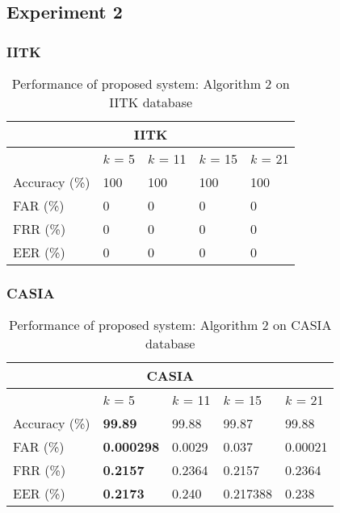 \documentclass{beamer}
\begin{document}
\subsection{Experiment 2}
\begin{frame}
\frametitle{IITK}
\begin{table}[ht]
\centering 
\begin{tabular}{| l || l | l | l | l | }
    \hline
    \multicolumn{5}{|c|}{IITK}\\
    \hline
    \hline
		  & $k$ = 5 & $k$ = 11 & $k$ = 15 & $k$ = 21 \\ \hline
    \hline
    Accuracy (\%) & 100 & 100 & 100& 100 \\ \hline
    FAR (\%) 	  & 0   & 0   & 0  & 0 	 \\ \hline
    FRR (\%)      & 0   & 0   & 0  & 0 	 \\ \hline
    EER (\%)      & 0   & 0   & 0  &  0  \\ \hline    
\end{tabular}
 \caption{Performance of proposed system: Algorithm 2 on IITK database\label{table:exp2_iitk}}
\end{table}
\end{frame}

\begin{frame}
\frametitle{CASIA}
\begin{table}[ht]
\centering 
\begin{tabular}{| l || l | l | l | l | }
    \hline
    \multicolumn{5}{|c|}{CASIA}\\
    \hline
    \hline
		  & $k$ = 5 & $k$ = 11 & $k$ = 15 & $k$ = 21 \\ \hline
    \hline
    Accuracy (\%) & \textbf{99.89}   & 99.88& 99.87 &  99.88    \\ \hline
    FAR (\%) 	  & \textbf{0.000298}& 0.0029& 0.037& 0.00021     \\ \hline
    FRR (\%)      & \textbf{0.2157}  & 0.2364& 0.2157& 0.2364     \\ \hline
    EER (\%)      & \textbf{0.2173}  & 0.240& 0.217388& 0.238    \\ \hline    
\end{tabular}
 \caption{Performance of proposed system: Algorithm 2 on CASIA database\label{table:exp2_casia}}
\end{table}
\end{frame}
\end{document}
